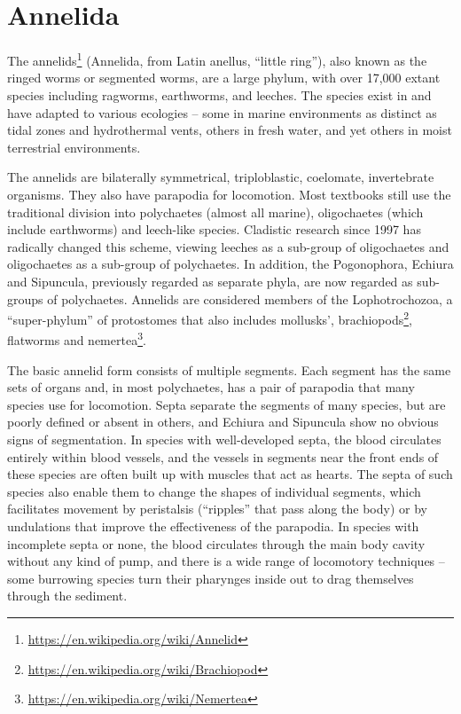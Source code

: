 \documentclass[]{book}
\let\rmarkdownfootnote\footnote%
\def\footnote{\protect\rmarkdownfootnote}
\renewcommand{\href}[2]{#2\footnote{\url{#1}}}
\theoremstyle{definition}
\theoremstyle{definition}
\theoremstyle{definition}
\theoremstyle{remark}
\begin{document}
\section{Annelida}\label{annelida}

The \href{https://en.wikipedia.org/wiki/Annelid}{annelids} (Annelida,
from Latin anellus, ``little ring''), also known as the ringed worms or
segmented worms, are a large phylum, with over 17,000 extant species
including ragworms, earthworms, and leeches. The species exist in and
have adapted to various ecologies -- some in marine environments as
distinct as tidal zones and hydrothermal vents, others in fresh water,
and yet others in moist terrestrial environments.

The annelids are bilaterally symmetrical, triploblastic, coelomate,
invertebrate organisms. They also have parapodia for locomotion. Most
textbooks still use the traditional division into polychaetes (almost
all marine), oligochaetes (which include earthworms) and leech-like
species. Cladistic research since 1997 has radically changed this
scheme, viewing leeches as a sub-group of oligochaetes and oligochaetes
as a sub-group of polychaetes. In addition, the Pogonophora, Echiura and
Sipuncula, previously regarded as separate phyla, are now regarded as
sub-groups of polychaetes. Annelids are considered members of the
Lophotrochozoa, a ``super-phylum'' of protostomes that also includes
mollusks', \href{https://en.wikipedia.org/wiki/Brachiopod}{brachiopods},
flatworms and \href{https://en.wikipedia.org/wiki/Nemertea}{nemertea}.

The basic annelid form consists of multiple segments. Each segment has
the same sets of organs and, in most polychaetes, has a pair of
parapodia that many species use for locomotion. Septa separate the
segments of many species, but are poorly defined or absent in others,
and Echiura and Sipuncula show no obvious signs of segmentation. In
species with well-developed septa, the blood circulates entirely within
blood vessels, and the vessels in segments near the front ends of these
species are often built up with muscles that act as hearts. The septa of
such species also enable them to change the shapes of individual
segments, which facilitates movement by peristalsis (``ripples'' that
pass along the body) or by undulations that improve the effectiveness of
the parapodia. In species with incomplete septa or none, the blood
circulates through the main body cavity without any kind of pump, and
there is a wide range of locomotory techniques -- some burrowing species
turn their pharynges inside out to drag themselves through the sediment.
\end{document}

